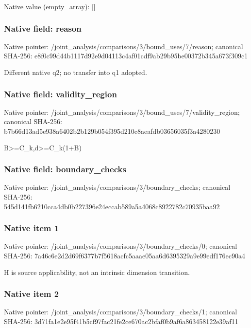 \documentclass[10pt,a4paper]{article}
\begin{document}
Native value (empty\_\allowbreak{}array): []

\subsubsection{Native field: reason}
Native pointer: /joint\_\allowbreak{}analysis/comparisons/3/bound\_\allowbreak{}uses/7/reason; canonical SHA-256: e8f0c99d44b1117d92e9d04113c4af01cdf9ab29b95be00372b345a673f309c1

\begingroup\raggedright\sloppy Different native q2;\allowbreak{} no transfer into q1 adopted.\par\endgroup

\subsubsection{Native field: validity\_\allowbreak{}region}
Native pointer: /joint\_\allowbreak{}analysis/comparisons/3/bound\_\allowbreak{}uses/7/validity\_\allowbreak{}region; canonical SHA-256: b7b66d13ad5e938a6402b2b129b054f395d210c8aeafdb03656035f3a4280230

\begingroup\raggedright\sloppy B>=\allowbreak{}C\_\allowbreak{}k,\allowbreak{}d>=\allowbreak{}C\_\allowbreak{}k(1+B)\par\endgroup

\subsubsection{Native field: boundary\_\allowbreak{}checks}
Native pointer: /joint\_\allowbreak{}analysis/comparisons/3/boundary\_\allowbreak{}checks; canonical SHA-256: 545d141fb6210cca4db0b227396e24eccab589a5a4068c8922782c70935baa92

\subsubsection{Native item 1}
Native pointer: /joint\_\allowbreak{}analysis/comparisons/3/boundary\_\allowbreak{}checks/0; canonical SHA-256: 7a46c6e2d2d69f6377b7f5618acfc5aaae05aa6d6395329a9e99edf176ec90a4

\begingroup\raggedright\sloppy H is source applicability,\allowbreak{} not an intrinsic dimension transition.\par\endgroup

\subsubsection{Native item 2}
Native pointer: /joint\_\allowbreak{}analysis/comparisons/3/boundary\_\allowbreak{}checks/1; canonical SHA-256: 3d71fa1e2e95f41b5cf97fac21fe2ce670ac2bfaf0b9af6a863458122e39af11
\end{document}
